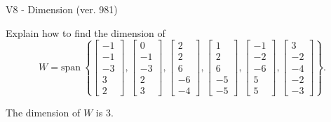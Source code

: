 \begin{exercise}
  \begin{exerciseTitle}V8 - Dimension (ver. 981)\end{exerciseTitle}
  \begin{exerciseStatement}
    Explain how to find the dimension of 
\[W=\mathrm{span}\ \left\{\left[\begin{array}{r}
-1 \\
-1 \\
-3 \\
3 \\
2
\end{array}\right] , \left[\begin{array}{r}
0 \\
-1 \\
-3 \\
2 \\
3
\end{array}\right] , \left[\begin{array}{r}
2 \\
2 \\
6 \\
-6 \\
-4
\end{array}\right] , \left[\begin{array}{r}
1 \\
2 \\
6 \\
-5 \\
-5
\end{array}\right] , \left[\begin{array}{r}
-1 \\
-2 \\
-6 \\
5 \\
5
\end{array}\right] , \left[\begin{array}{r}
3 \\
-2 \\
-4 \\
-2 \\
-3
\end{array}\right]\right\}.\]



  \end{exerciseStatement}
  \begin{exerciseAnswer}
   The dimension of \(W\) is  \(3\).
  


  \end{exerciseAnswer}
\end{exercise}